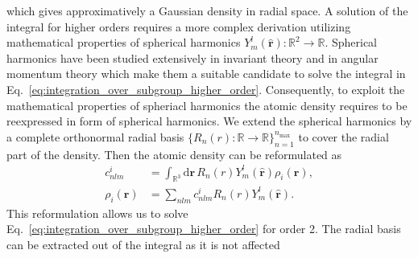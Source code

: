 which gives approximatively a Gaussian density in radial space.
A solution of the integral for higher orders requires a more complex derivation utilizing mathematical properties of spherical harmonics $Y_m^l(\hat{\mathbf{r}}):\mathbb{R}^2\rightarrow\mathbb{R}$. %
Spherical harmonics have been studied extensively in invariant theory\cite{dowker2008spherical} and in angular momentum theory\cite{yutsis1965theory} which make them a suitable candidate to solve the integral in Eq.~\ref{eq:integration_over_subgroup_higher_order}.
Consequently, to exploit the mathematical properties of spheriacl harmonics the atomic density requires to be reexpressed in form of spherical harmonics.
We extend the spherical harmonics by a complete orthonormal radial basis $\{R_n(r) :\mathbb{R}\rightarrow\mathbb{R}\}_{n=1}^{n_\textrm{max}}$ to cover the radial part of the density.
Then the atomic density can be reformulated as
\begin{subequations}
\begin{align}
  c^i_{nlm} &= \int_{\mathbb{R}^3}\mathrm{d}\mathbf{r}\, R_n(r)Y^l_m(\hat{\mathbf{r}})\rho_i(\mathbf{r}), \\
  \rho_i(\mathbf{r}) &= \sum_{nlm} c^i_{nlm}R_n(r)Y^l_m(\hat{\mathbf{r}}).
  \label{eq:radial_angular_density}
\end{align}
\end{subequations}
This reformulation allows us to solve Eq.~\ref{eq:integration_over_subgroup_higher_order} for order 2.
The radial basis can be extracted out of the integral as it is not affected 
